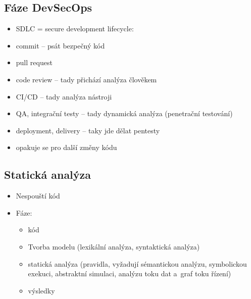 

\subsection{Fáze DevSecOps}
\begin{itemize}
    \item SDLC = secure development lifecycle:
    \item commit -- psát bezpečný kód
    \item pull request
    \item code review -- tady přichází analýza člověkem
    \item CI/CD -- tady analýza nástroji
    \item QA, integrační testy -- tady dynamická analýza (penetrační testování)
    \item deployment, delivery -- taky jde dělat pentesty
    \item opakuje se pro další změny kódu
\end{itemize}

\subsection{Statická analýza}
\begin{itemize}
    \item Nespouští kód
    \item Fáze:
    \begin{itemize}
        \item kód
        \item Tvorba modelu (lexikální analýza, syntaktická analýza)
        \item statická analýza (pravidla, vyžadují sémantickou analýzu, symbolickou exekuci, abstraktní simulaci, analýzu toku dat a~graf toku řízení)
        \item výsledky
    \end{itemize}
\end{itemize}

